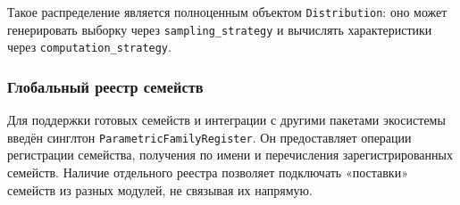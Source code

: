 Такое распределение является полноценным объектом \texttt{Distribution}: оно может генерировать выборку через \texttt{sampling\_strategy} и вычислять характеристики через \texttt{computation\_strategy}.

\subsubsection{Глобальный реестр семейств}

Для поддержки готовых семейств и интеграции с другими пакетами экосистемы введён синглтон \texttt{ParametricFamilyRegister}. Он предоставляет операции регистрации семейства, получения по имени и перечисления зарегистрированных семейств. Наличие отдельного реестра позволяет подключать «поставки» семейств из разных модулей, не связывая их напрямую.

